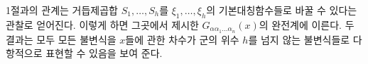 
1절과의 관계는 거듭제곱합 $S_1,\ldots,S_h$를 $\xi_1,\ldots,\xi_h$의 기본대칭함수들로 바꿀 수 있다는 관찰로 얻어진다. 이렇게 하면 그곳에서 제시한 $G_{\alpha\alpha_1\ldots\alpha_n}(x)$의 완전계에 이른다. 두 결과는 모두 모든 불변식을 $x$들에 관한 차수가 군의 위수 $h$를 넘지 않는 불변식들로 다항적으로 표현할 수 있음을 보여 준다.
